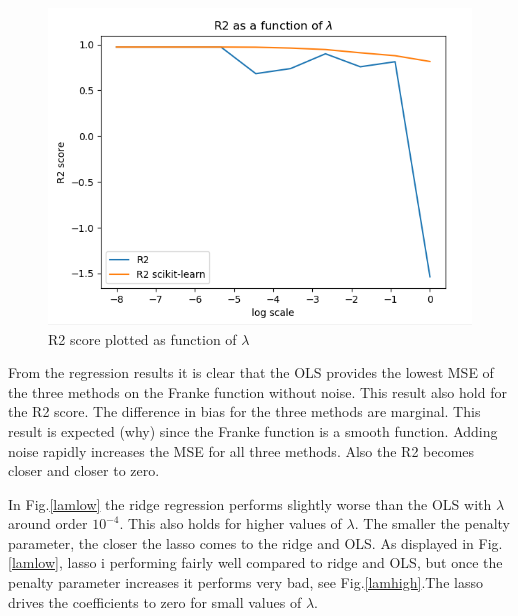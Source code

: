 \documentclass[a4paper,11pt,twocolumn]{article}
\begin{document}
\begin{figure}[h]
\centering
\includegraphics[scale=0.75]{r2lam}
\caption{R2 score plotted as function of $\lambda$}
\label{r2lamb}
\end{figure}

From the regression results it is clear that the OLS provides the lowest MSE of the three methods on the Franke function without noise. This result also hold for the R2 score. The difference in bias for the three methods are marginal. This result is expected (why) since the Franke function is a smooth function. Adding noise rapidly increases the MSE for all three methods. Also the R2 becomes closer and closer to zero.

In Fig.\ref{lamlow} the ridge regression performs slightly worse than the OLS with $\lambda$ around order $10^{-4}$. This also holds for higher values of $\lambda$. The smaller the penalty parameter, the closer the lasso comes to the ridge and OLS. As displayed in Fig. \ref{lamlow}, lasso i performing fairly well compared to ridge and OLS, but once the penalty parameter increases it performs very bad, see Fig.\ref{lamhigh}.The lasso drives the coefficients to zero for small values of $\lambda$.
\end{document}
